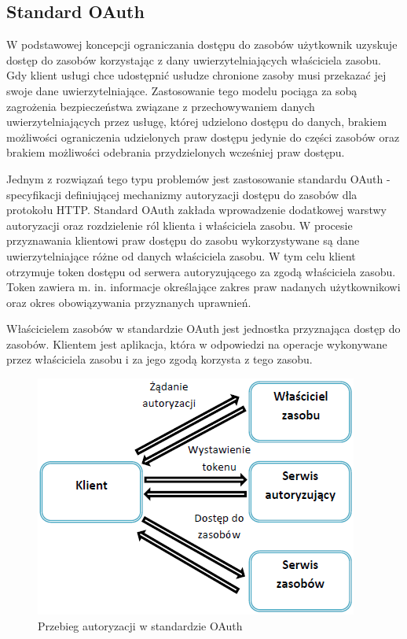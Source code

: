 	\subsection{Standard OAuth}

		W podstawowej koncepcji ograniczania dostępu do zasobów użytkownik uzyskuje dostęp do zasobów korzystając z dany uwierzytelniających właściciela zasobu. Gdy klient usługi chce udostępnić usłudze chronione zasoby musi przekazać jej swoje dane uwierzytelniające.  Zastosowanie tego modelu pociąga za sobą zagrożenia bezpieczeństwa związane z przechowywaniem danych uwierzytelniających przez usługę, której udzielono dostępu do danych, brakiem możliwości ograniczenia udzielonych praw dostępu jedynie do części zasobów oraz brakiem możliwości odebrania przydzielonych wcześniej praw dostępu.

		Jednym z rozwiązań tego typu problemów jest zastosowanie standardu OAuth - specyfikacji definiującej mechanizmy autoryzacji dostępu do zasobów dla protokołu HTTP\cite{Hardt12}. Standard OAuth zakłada wprowadzenie dodatkowej warstwy autoryzacji  oraz rozdzielenie ról klienta i właściciela zasobu. W procesie przyznawania klientowi praw dostępu do zasobu wykorzystywane są dane uwierzytelniające różne od danych właściciela zasobu. W tym celu klient otrzymuje token dostępu od serwera autoryzującego za zgodą właściciela zasobu. Token zawiera m. in. informacje określające zakres praw nadanych użytkownikowi oraz okres obowiązywania przyznanych uprawnień. 

		Właścicielem zasobów w standardzie OAuth jest jednostka przyznająca dostęp do zasobów. Klientem jest aplikacja, która w odpowiedzi na operacje wykonywane przez  właściciela zasobu i za jego zgodą korzysta z tego zasobu.

		\begin{figure}[h]
			\centering
				\includegraphics{img/oauth.png}
			\caption{Przebieg autoryzacji w standardzie OAuth}
			\label{Przebieg autoryzacji w standardzie OAuth}
		\end{figure}

